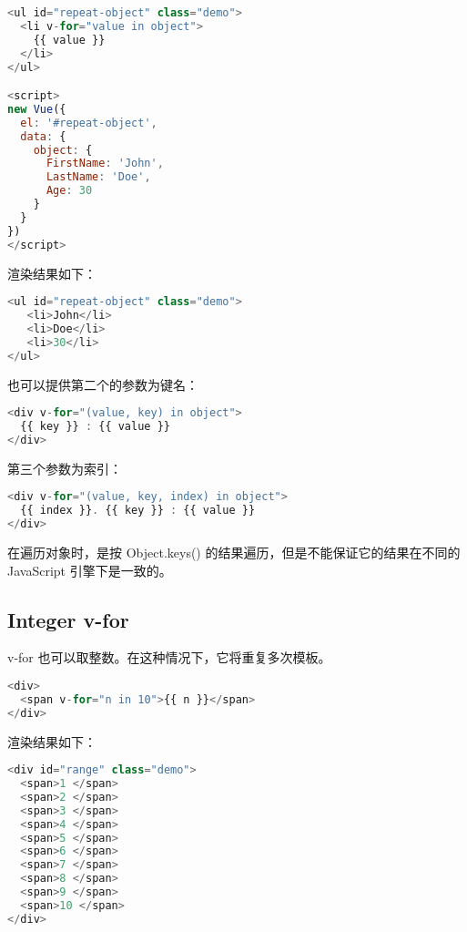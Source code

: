 \begin{lstlisting}[language=JavaScript]
<ul id="repeat-object" class="demo">
  <li v-for="value in object">
    {{ value }}
  </li>
</ul>

<script>
new Vue({
  el: '#repeat-object',
  data: {
    object: {
      FirstName: 'John',
      LastName: 'Doe',
      Age: 30
    }
  }
})
</script>
\end{lstlisting}

渲染结果如下：

\begin{lstlisting}[language=JavaScript]
<ul id="repeat-object" class="demo">
   <li>John</li>
   <li>Doe</li>
   <li>30</li>
</ul>
\end{lstlisting}

也可以提供第二个的参数为键名：


\begin{lstlisting}[language=JavaScript]
<div v-for="(value, key) in object">
  {{ key }} : {{ value }}
</div>
\end{lstlisting}

第三个参数为索引：

\begin{lstlisting}[language=JavaScript]
<div v-for="(value, key, index) in object">
  {{ index }}. {{ key }} : {{ value }}
</div>
\end{lstlisting}

在遍历对象时，是按 Object.keys() 的结果遍历，但是不能保证它的结果在不同的 JavaScript 引擎下是一致的。

\subsection{Integer v-for}

v-for 也可以取整数。在这种情况下，它将重复多次模板。


\begin{lstlisting}[language=JavaScript]
<div>
  <span v-for="n in 10">{{ n }}</span>
</div>
\end{lstlisting}



渲染结果如下：


\begin{lstlisting}[language=JavaScript]
<div id="range" class="demo">
  <span>1 </span>
  <span>2 </span>
  <span>3 </span>
  <span>4 </span>
  <span>5 </span>
  <span>6 </span>
  <span>7 </span>
  <span>8 </span>
  <span>9 </span>
  <span>10 </span>
</div>
\end{lstlisting}

